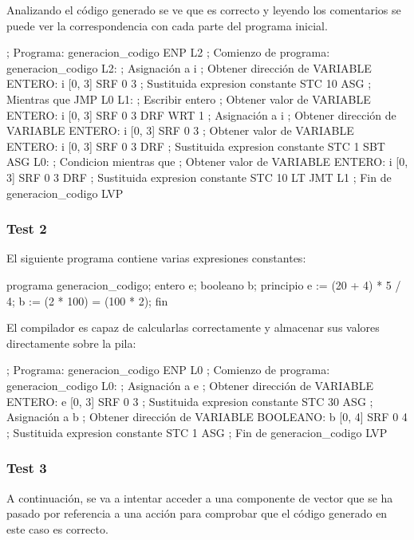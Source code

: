 Analizando el código generado se ve que es correcto y leyendo los comentarios se puede ver la correspondencia con cada parte del programa inicial.

\begin{codigo}
; Programa: generacion_codigo
	ENP L2
; Comienzo de programa: generacion_codigo
L2:
; Asignación a i
; Obtener dirección de VARIABLE ENTERO:          i [0, 3]
	SRF 0 3
; Sustituida expresion constante
	STC 10
	ASG
; Mientras que
	JMP L0
L1:
; Escribir entero
; Obtener valor de VARIABLE ENTERO:          i [0, 3]
	SRF 0 3
	DRF
	WRT 1
; Asignación a i
; Obtener dirección de VARIABLE ENTERO:          i [0, 3]
	SRF 0 3
; Obtener valor de VARIABLE ENTERO:          i [0, 3]
	SRF 0 3
	DRF
; Sustituida expresion constante
	STC 1
	SBT
	ASG
L0:
; Condicion mientras que
; Obtener valor de VARIABLE ENTERO:          i [0, 3]
	SRF 0 3
	DRF
; Sustituida expresion constante
	STC 10
	LT
	JMT L1
; Fin de generacion_codigo
	LVP
\end{codigo}

\subsubsection{Test 2}
El siguiente programa contiene varias expresiones constantes:

\begin{codigo}[style=minileng,numbers=left]
programa generacion_codigo;
entero e;
booleano b;
principio
    e := (20 + 4) * 5 / 4;
    b := (2 * 100) = (100 * 2);
fin
\end{codigo}

El compilador es capaz de calcularlas correctamente y almacenar sus valores directamente sobre la pila:

\begin{codigo}
; Programa: generacion_codigo
	ENP L0
; Comienzo de programa: generacion_codigo
L0:
; Asignación a e
; Obtener dirección de VARIABLE ENTERO:          e [0, 3]
	SRF 0 3
; Sustituida expresion constante
	STC 30
	ASG
; Asignación a b
; Obtener dirección de VARIABLE BOOLEANO:        b [0, 4]
	SRF 0 4
; Sustituida expresion constante
	STC 1
	ASG
; Fin de generacion_codigo
	LVP
\end{codigo}

\subsubsection{Test 3}
A continuación, se va a intentar acceder a una componente de vector que se ha pasado por referencia a una acción para comprobar que el código generado en este caso es correcto.

